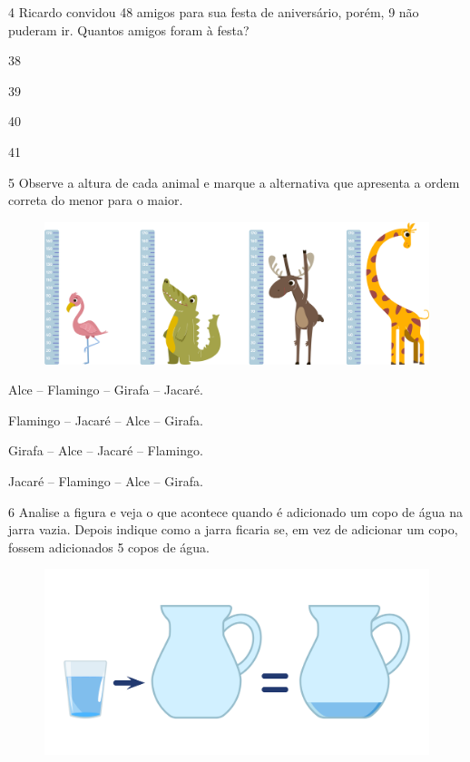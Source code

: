 \num{4} Ricardo convidou 48 amigos para sua festa de aniversário, porém, 9 não
puderam ir. Quantos amigos foram à festa?

\begin{escolha}
\item 38

\item 39

\item 40

\item 41
\end{escolha}

\pagebreak
\num{5} Observe a altura de cada animal e marque a alternativa que apresenta a
ordem correta do menor para o maior.

\begin{figure}[htpb!]
\includegraphics[width=\textwidth]{./media/image139.png}
\end{figure}

\begin{escolha}
\item Alce -- Flamingo -- Girafa -- Jacaré.

\item Flamingo -- Jacaré -- Alce -- Girafa.

\item Girafa -- Alce -- Jacaré -- Flamingo.

\item Jacaré -- Flamingo -- Alce -- Girafa.
\end{escolha}

\num{6} Analise a figura e veja o que acontece quando é adicionado um copo de
água na jarra vazia. Depois indique como a jarra ficaria se, em vez de
adicionar um copo, fossem adicionados 5 copos de água.

\begin{figure}[htpb!]
\centering
\includegraphics[width=\textwidth]{./media/image140.png}
\end{figure}

